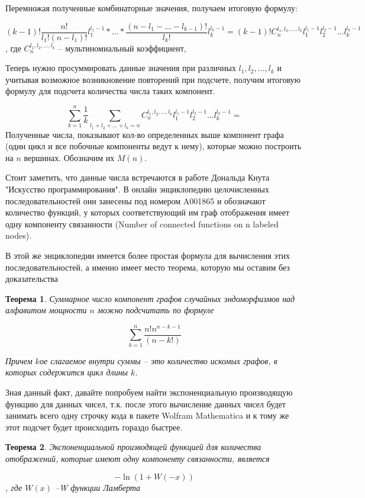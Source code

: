 \documentclass[10pt, a4paper]{report}
\newtheorem{theorem}{Теорема}[chapter]
\theoremstyle{definition}
\begin{document}
Перемножая полученные комбинаторные значения, получаем итоговую формулу:

$$
(k-1)!\frac{n!}{l_1!(n - l_1)!} l_1^{l_1-1} * ... * \frac{(n - l_1 - ... -l_{k-1})!}{l_k!} l_k^{l_k-1}=
(k-1)!C^{l_1, l_2, ..., l_k}_n l_1^{l_1-1}l_2^{l_2-1}...l_k^{l_k-1}
$$
, где $C^{l_1, l_2, ..., l_k}_n$ -- мультиномиальный коэффициент,

Теперь нужно просуммировать данные значения при различных $l_1, l_2, ..., l_k$ и учитывая возможное возникновение повторений при подсчете, получим итоговую формулу для подсчета количества числа таких компонент.

$$
\sum_{k=1}^{n}\frac 1 {k}\sum_{l_1+l_2+...+l_k=n} C^{l_1, l_2, ..., l_k}_n l_1^{l_1-1}l_2^{l_2-1}...l_k^{l_k-1}=
$$
Полученные числа, показывают кол-во определенных выше компонент графа (один цикл и все побочные компоненты ведут к нему), которые можно построить на $n$ вершинах. Обозначим их $M(n)$.


Стоит заметить, что данные числа встречаются в работе Дональда Кнута "Искусство программирования". В онлайн энциклопедию целочисленных последовательностей они занесены под номером A001865 и обозначают количество функций, у которых соответствующий им граф отображения имеет одну компоненту связанности (Number of connected functions on n labeled nodes)\cite{Main-lib}.

В этой же энциклопедии имеется более простая формула для вычисления этих последовательностей, а именно имеет место теорема, которую мы оставим без доказательства

\begin{theorem}
Суммарное число компонент графов случайных эндоморфизмов над алфавитом мощности $n$ можно подсчитать по формуле

\begin{equation}
	\label{M-coef}
	\sum_{k=1}^n \frac{n!n^{n-k-1}}{(n-k!)}
\end{equation}

Причем $k$ое слагаемое внутри суммы -- это количество искомых графов, в которых содержится цикл длины $k$.
\end{theorem}

Зная данный факт, давайте попробуем найти экспоненциальную производящую функцию для данных чисел, т.к. после этого вычисление данных чисел будет занимать всего одну строчку кода в пакете Wolfram Mathematica и к тому же этот подсчет будет происходить гораздо быстрее. 

\begin{theorem}
	Экспоненциальной производящей функцией для количества отображений, которые имеют одну компоненту связанности, является 

$$-\ln(1+W(-x))$$
, где $W(x)$ --W функции Ламберта\cite{W-lib}

\end{theorem}
\end{document}
